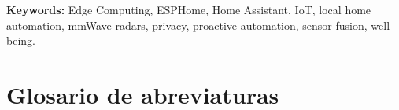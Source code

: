 \documentclass[a4paper, 12pt]{article}
\begin{document}
\vspace{1cm}
\noindent \textbf{Keywords:} Edge Computing, ESPHome, Home Assistant, IoT, local home automation, mmWave radars, privacy, proactive automation, sensor fusion, well-being.
\clearpage

\pagestyle{indice}
\thispagestyle{indice}
\tableofcontents

\newpage
\renewcommand{\listfigurename}{Índice de ilustraciones}
\listoffigures

\newpage
\section*{Glosario de abreviaturas}
\end{document}
